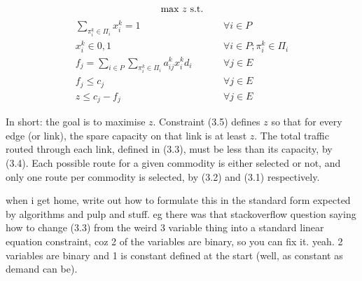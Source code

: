 \begin{equation*}
	\text{max } z \text{ s.t.} \\
\end{equation*}
\begin{align}
	\sum_{\pi_i^k \in \Pi_i} x_i^k = 1 \hspace{1cm} &\forall i \in P \\
	x_i^k \in {0,1} \hspace{1cm} &\forall i \in P; \pi_i^k \in \Pi_i \\
	f_j = \sum_{i \in P} \sum_{\pi_i^k \in \Pi_i} a_{ij}^k x_i^k d_i \hspace{1cm} &\forall j \in E \\
	f_j \leq c_j \hspace{1cm} &\forall j \in E \\
	z \leq c_j - f_j \hspace{1cm} &\forall j \in E
\end{align}

In short: the goal is to maximise $z$. Constraint (3.5) defines $z$ so that for every edge (or link), the spare capacity on that link is at least $z$. The total traffic routed through each link, defined in (3.3), must be less than its capacity, by (3.4). Each possible route for a given commodity is either selected or not, and only one route per commodity is selected, by (3.2) and (3.1) respectively.

\newpage
when i get home, write out how to formulate this in the standard form expected by algorithms and pulp and stuff. eg there was that stackoverflow question saying how to change (3.3) from the weird 3 variable thing into a standard linear equation constraint, coz 2 of the variables are binary, so you can fix it. yeah. 2 variables are binary and 1 is constant defined at the start (well, as constant as demand can be).
